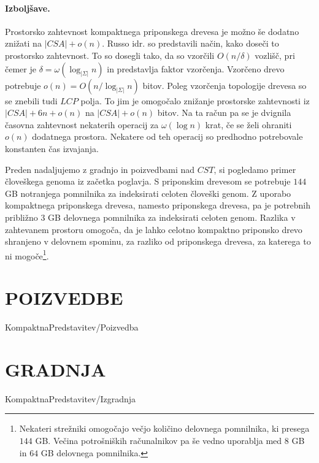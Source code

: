 \paragraph{Izboljšave.}
Prostorsko zahtevnost kompaktnega priponskega drevesa je možno še dodatno znižati na $|CSA|+o(n)$. Russo idr. \cite{Russo2008} so predstavili način, kako doseči to prostorsko zahtevnost. To so dosegli tako, da so vzorčili $O(n/\delta)$ vozlišč, pri čemer je $\delta=\omega(\log_{|\Sigma|}{n})$ in predstavlja faktor vzorčenja. Vzorčeno drevo potrebuje $o(n)=O(n/\log_{|\Sigma|}{n})$ bitov. Poleg vzorčenja topologije drevesa so se znebili tudi $LCP$ polja. To jim je omogočalo znižanje prostorske zahtevnosti iz $|CSA|+6n+o(n)$ na $|CSA|+o(n)$ bitov. Na ta račun pa se je dvignila časovna zahtevnost nekaterih operacij za $\omega(\log{n})$ krat, če se želi ohraniti $o(n)$ dodatnega prostora. Nekatere od teh operacij so predhodno potrebovale konstanten čas izvajanja.

Preden nadaljujemo z gradnjo in poizvedbami nad $CST$, si pogledamo primer človeškega genoma iz začetka poglavja. S priponskim drevesom se potrebuje $144$ GB notranjega pomnilnika za indeksirati celoten človeški genom. Z uporabo kompaktnega priponskega drevesa, namesto priponskega drevesa, pa je potrebnih približno $3$ GB delovnega pomnilnika za indeksirati celoten genom. Razlika v zahtevanem prostoru omogoča, da je lahko celotno kompaktno priponsko drevo shranjeno v delovnem spominu, za razliko od priponskega drevesa, za katerega to ni mogoče\footnote{Nekateri strežniki omogočajo večjo količino delovnega pomnilnika, ki presega $144$ GB. Večina potrošniških računalnikov pa še vedno uporablja med $8$ GB in $64$ GB delovnega pomnilnika.}.

\section{POIZVEDBE}\label{sec:CSTpoizvedba}
{KompaktnaPredstavitev/Poizvedba}

\section{GRADNJA}\label{sec:CSTizgradnja}
{KompaktnaPredstavitev/Izgradnja}




